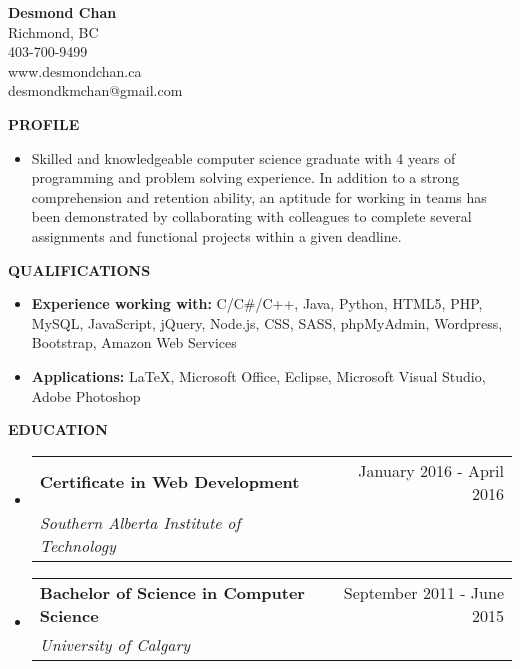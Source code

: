 \documentclass[letterpaper,11pt]{article}
\makeatletter
\newcommand{\resitem}[1]{\item #1 \vspace{-2pt}}
\newcommand{\resheading}[1]{{\large \colorbox{mygrey}{\begin{minipage}{\textwidth}{\textbf{#1 \vphantom{p\^{E}}}}\end{minipage}}}}
\newcommand{\ressubheading}[4]{
\begin{tabular*}{7.0in}{l@{\extracolsep{\fill}}r}
		\textbf{#1} & #2 \\
		\textit{#3} & \textit{#4} \\
\end{tabular*}\vspace{-6pt}}
\makeatother
\begin{document}
\begin{center}
\textbf{\huge Desmond Chan}\\
Richmond, BC \\ 403-700-9499 \\ www.desmondchan.ca\\ desmondkmchan@gmail.com \\ 
\end{center}

\vspace{0.1in}
\resheading{PROFILE}
\begin{itemize}

\item[]
Skilled and knowledgeable computer science graduate with 4 years of programming and problem solving experience. In addition to a strong comprehension and retention ability, an aptitude for working in teams has been demonstrated by collaborating with colleagues to complete several assignments and functional projects within a given deadline. 
\end{itemize}
\resheading{QUALIFICATIONS}

\begin{itemize}

\resitem{\textbf{Experience working with: }
C/C\#/C++, Java, Python, HTML5, PHP, MySQL, JavaScript, jQuery, Node.js, CSS, SASS, phpMyAdmin, Wordpress, Bootstrap, Amazon Web Services}

\resitem{\textbf{Applications: }
\LaTeX, Microsoft Office, Eclipse, Microsoft Visual Studio, Adobe Photoshop}

\end{itemize}

\resheading{EDUCATION}
\begin{itemize}
\item
	\ressubheading{Certificate in Web Development}{January 2016 - April 2016}{Southern Alberta Institute of Technology}{}
\item
	\ressubheading{Bachelor of Science in Computer Science}{September 2011 - June 2015}{University of Calgary}{}


\end{itemize}
\end{document}
